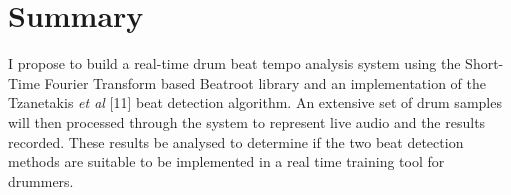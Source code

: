 \documentclass[a4paper, 11pt]{article}
\begin{document}
\section{Summary}
I propose to build a real-time drum beat tempo analysis system using the Short-Time Fourier Transform based Beatroot library and an implementation of the Tzanetakis \textit{et al} [11] beat detection algorithm. An extensive set of drum samples will then processed through the system to represent live audio and the results recorded. These results be analysed to determine if the two beat detection methods are suitable to be implemented in a real time training tool for drummers.


\maketitle{} 
\end{document}
